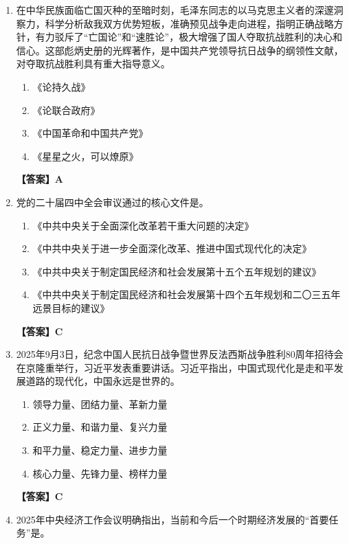\documentclass[UTF8,11pt,a4paper]{ctexart}
\begin{document}
\begin{enumerate}[label=\textbf{\arabic*.}, leftmargin=2.5em, itemsep=0.7em]
\begin{enumerate}[label=\Alph*., leftmargin=2em, itemsep=0.1em, topsep=0.15em]
\end{enumerate}
\textbf{【答案】A}
\item 在中华民族面临亡国灭种的至暗时刻，毛泽东同志的\allowbreak\underline{\hspace{4em}}以马克思主义者的深邃洞察力，科学分析敌我双方优势短板，准确预见战争走向进程，指明正确战略方针，有力驳斥了“亡国论”和“速胜论”，极大增强了国人夺取抗战胜利的决心和信心。这部彪炳史册的光辉著作，是中国共产党领导抗日战争的纲领性文献，对夺取抗战胜利具有重大指导意义。
\begin{enumerate}[label=\Alph*., leftmargin=2em, itemsep=0.1em, topsep=0.15em]
\item 《论持久战》
\item 《论联合政府》
\item 《中国革命和中国共产党》
\item 《星星之火，可以燎原》
\end{enumerate}
\textbf{【答案】A}
\item 党的二十届四中全会审议通过的核心文件是\allowbreak\underline{\hspace{4em}}。
\begin{enumerate}[label=\Alph*., leftmargin=2em, itemsep=0.1em, topsep=0.15em]
\item 《中共中央关于全面深化改革若干重大问题的决定》
\item 《中共中央关于进一步全面深化改革、推进中国式现代化的决定》
\item 《中共中央关于制定国民经济和社会发展第十五个五年规划的建议》
\item 《中共中央关于制定国民经济和社会发展第十四个五年规划和二〇三五年远景目标的建议》
\end{enumerate}
\textbf{【答案】C}
\item 2025年9月3日，纪念中国人民抗日战争暨世界反法西斯战争胜利80周年招待会在京隆重举行，习近平发表重要讲话。习近平指出，中国式现代化是走和平发展道路的现代化，中国永远是世界的\allowbreak\underline{\hspace{4em}}。
\begin{enumerate}[label=\Alph*., leftmargin=2em, itemsep=0.1em, topsep=0.15em]
\item 领导力量、团结力量、革新力量
\item 正义力量、和谐力量、复兴力量
\item 和平力量、稳定力量、进步力量
\item 核心力量、先锋力量、榜样力量
\end{enumerate}
\textbf{【答案】C}
\item 2025年中央经济工作会议明确指出，当前和今后一个时期经济发展的“首要任务”是\allowbreak\underline{\hspace{4em}}。

\end{enumerate}
\end{document}
